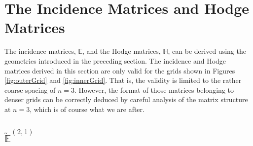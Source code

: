 \section{The Incidence Matrices and Hodge Matrices}

The incidence matrices, $\mathbb{E}$, and the Hodge matrices, $\mathbb{H}$, can be derived using the geometries introduced in the preceding section. The incidence and Hodge matrices derived in this section are only valid for the grids shown in Figures \ref{fig:outerGrid} and \ref{fig:innerGrid}. That is, the validity is limited to the rather coarse spacing of $n = 3$. However, the format of those matrices belonging to denser grids can be correctly deduced by careful analysis of the matrix structure at $n = 3$, which is of course what we are after.

\subsection{$\tilde{\mathbb{E}}^{(2,1)}$}

